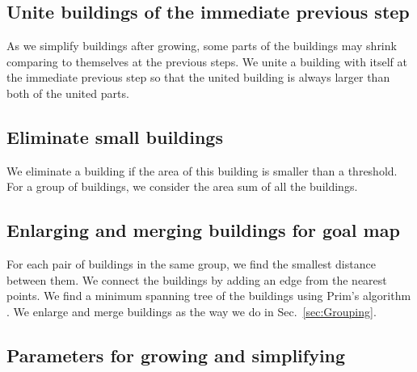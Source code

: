 \documentclass[graybox]{svmult}
\newcommand{\sect}{Sec.~}
\begin{document}
\subsection{Unite buildings of the immediate previous step}
\label{sec:Unite}

As we simplify buildings after growing, 
some parts of the buildings may shrink 
comparing to themselves at the previous steps.
We unite a building with itself at the immediate previous step so that the 
united building is always larger than both of the united parts.


\subsection{Eliminate small buildings}
\label{sec:Eliminate}
We eliminate a building if the area of this building is smaller than a 
threshold.
For a group of buildings, we consider the area sum of all the buildings.





\subsection{Enlarging and merging buildings for goal map}
For each pair of buildings in the same group, 
we find the smallest distance between them.
We connect the buildings by adding an edge from the nearest points.
We find a minimum spanning tree of the buildings using Prim's algorithm 
\parencite{Prim1957}.
We enlarge and merge buildings as the way we do in \sect\ref{sec:Grouping}.






\subsection{Parameters for growing and simplifying}
\end{document}
